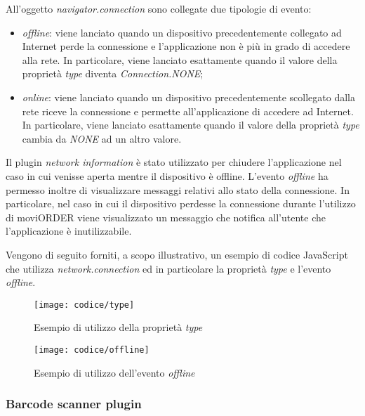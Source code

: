 All'oggetto \textit{navigator.connection} sono collegate due tipologie di evento:
\begin{itemize}
	\item \textit{offline}: viene lanciato quando un dispositivo precedentemente collegato ad Internet perde la connessione e l'applicazione non è più in grado di accedere alla rete. In particolare, viene lanciato esattamente quando il valore della proprietà \textit{type} diventa \textit{Connection.NONE};
	\item \textit{online}: viene lanciato quando un dispositivo precedentemente scollegato dalla rete riceve la connessione e permette all'applicazione di accedere ad Internet. In particolare, viene lanciato esattamente quando il valore della proprietà \textit{type} cambia da \textit{NONE} ad un altro valore.
\end{itemize}
Il plugin \textit{network information} è stato utilizzato per chiudere l'applicazione nel caso in cui venisse aperta mentre il dispositivo è offline. L'evento \textit{offline} ha permesso inoltre di visualizzare messaggi relativi allo stato della connessione. In particolare, nel caso in cui il dispositivo perdesse la connessione durante l'utilizzo di moviORDER viene visualizzato un messaggio che notifica all'utente che l'applicazione è inutilizzabile.

Vengono di seguito forniti, a scopo illustrativo, un esempio di codice JavaScript che utilizza \textit{network.connection} ed in particolare la proprietà \textit{type} e l'evento \textit{offline}.

\begin{figure}[!h] 
    \centering 
    \texttt{[image: codice/type]} 
    \caption{Esempio di utilizzo della proprietà \textit{type}}
\end{figure}

\begin{figure}[!h] 
    \centering 
    \texttt{[image: codice/offline]} 
    \caption{Esempio di utilizzo dell'evento \textit{offline}}
\end{figure}

\subsubsection{Barcode scanner plugin}

